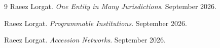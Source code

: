 \documentclass{momentum}
\begin{document}
\begin{thebibliography}{9}
Raeez Lorgat.
\emph{One Entity in Many Jurisdictions}.
September 2026.

Raeez Lorgat.
\emph{Programmable Institutions}.
September 2026.

Raeez Lorgat.
\emph{Accession Networks}.
September 2026.
\end{thebibliography}
\end{document}
